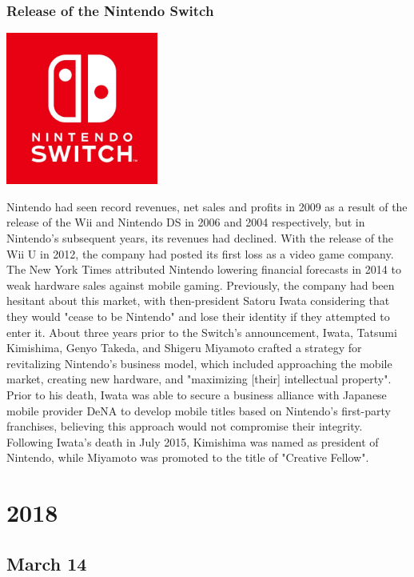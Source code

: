 \documentclass[11pt]{report}
\begin{document}
\subsection{Release of the Nintendo Switch}
\vspace{2mm}\begin{center}\includegraphics[width=5cm]{./img/nintendoswitchLogo.jpg}\end{center}
Nintendo had seen record revenues, net sales and profits in 2009 as a result of the release of the Wii and Nintendo DS in 2006 and 2004 respectively, but in Nintendo's subsequent years, its revenues had declined. With the release of the Wii U in 2012, the company had posted its first loss as a video game company. The New York Times attributed Nintendo lowering financial forecasts in 2014 to weak hardware sales against mobile gaming. Previously, the company had been hesitant about this market, with then-president Satoru Iwata considering that they would "cease to be Nintendo" and lose their identity if they attempted to enter it. About three years prior to the Switch's announcement, Iwata, Tatsumi Kimishima, Genyo Takeda, and Shigeru Miyamoto crafted a strategy for revitalizing Nintendo's business model, which included approaching the mobile market, creating new hardware, and "maximizing [their] intellectual property". Prior to his death, Iwata was able to secure a business alliance with Japanese mobile provider DeNA to develop mobile titles based on Nintendo's first-party franchises, believing this approach would not compromise their integrity. Following Iwata's death in July 2015, Kimishima was named as president of Nintendo, while Miyamoto was promoted to the title of "Creative Fellow".

\chapter{2018}
\section{March 14}
\end{document}
